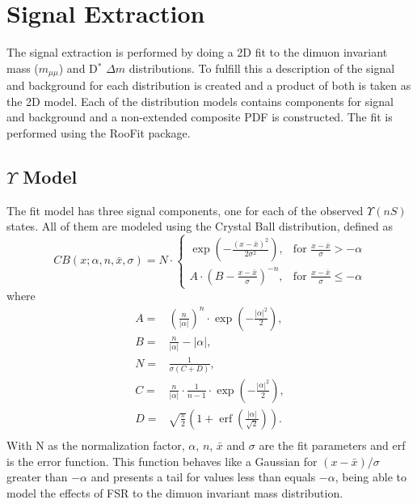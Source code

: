 \section{Signal Extraction}\label{sec:sig_extraction}

The signal extraction is performed by doing a 2D fit to the dimuon invariant mass ($m_{\mu\mu}$) and D$^*$ $\Delta m$ distributions. To fulfill this a description of the signal and background for each distribution is created and a product of both is taken as the 2D model. Each of the distribution models contains components for signal and background and a non-extended composite PDF is constructed. The fit is performed using the RooFit package.

\subsection{\texorpdfstring{$\Upsilon$}{Y} Model}

The fit model has three signal components, one for each of the observed $\Upsilon(nS)$ states. All of them are modeled using the Crystal Ball distribution, defined as
\begin{equation}
  CB(x;\alpha,n,\bar x,\sigma) = N \cdot
  \begin{cases}
    \exp(- \frac{(x - \bar x)^2}{2 \sigma^2}),    & \mbox{for }\frac{x - \bar x}{\sigma} > -\alpha         \\
    A \cdot (B - \frac{x - \bar x}{\sigma})^{-n}, & \mbox{for }\frac{x - \bar x}{\sigma} \leqslant -\alpha
  \end{cases}
\end{equation}
where
\begin{equation}
  \begin{split}
    A = & \left(\frac{n}{\left| \alpha \right|}\right)^n \cdot \exp\left(- \frac {\left| \alpha \right|^2}{2}\right), \\
    B = & \frac{n}{\left| \alpha \right|}  - \left| \alpha \right|, \\
    N = & \frac{1}{\sigma (C + D)}, \\
    C = & \frac{n}{\left| \alpha \right|} \cdot \frac{1}{n-1} \cdot \exp\left(- \frac {\left| \alpha \right|^2}{2}\right), \\
    D = & \sqrt{\frac{\pi}{2}} \left(1 + \operatorname{erf}\left(\frac{\left| \alpha \right|}{\sqrt 2}\right)\right). \\
  \end{split}
\end{equation}
With N as the normalization factor, $\alpha$, $n$, $\bar x$ and $\sigma$ are the fit parameters and erf is the error function. This function behaves like a Gaussian for $(x-\bar x)/\sigma$ greater than $-\alpha$ and presents a tail for values less than equals $-\alpha$, being able to model the effects of FSR to the dimuon invariant mass distribution.

